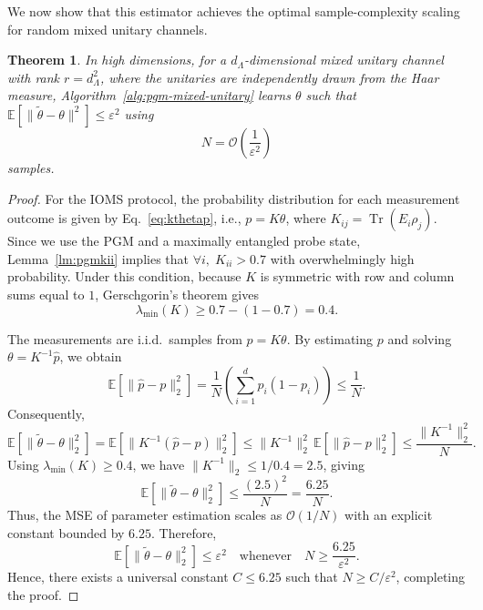 \documentclass[12pt]{article}
\newtheorem{theorem}{Theorem}
\begin{document}
We now show that this estimator achieves the optimal sample-complexity scaling for random mixed unitary channels.

\begin{theorem}
In high dimensions, for a $d_{\Lambda}$-dimensional mixed unitary channel with rank $r = d_{\Lambda}^2$, where the unitaries are independently drawn from the Haar measure, Algorithm~\ref{alg:pgm-mixed-unitary} learns $\theta$ such that $\mathbb{E}[\|\tilde{\theta} -\theta \|^2] \le \varepsilon^2$ using
\begin{equation}
    N = \mathcal{O}\!\left(\frac{1}{\varepsilon^2}\right)
\end{equation}
samples.
\end{theorem}


\begin{proof}
For the IOMS protocol, the probability distribution for each measurement outcome is given by Eq.~\ref{eq:kthetap}, i.e., $p = K\theta$, where $K_{ij} = \operatorname{Tr}(E_i \rho_j)$. 
Since we use the PGM and a maximally entangled probe state, Lemma~\ref{lm:pgmkii} implies that $\forall i,\; K_{ii} > 0.7$ with overwhelmingly high probability. 
Under this condition, because $K$ is symmetric with row and column sums equal to $1$, Gerschgorin’s theorem gives
\begin{equation}
    \lambda_{\min}(K) \ge 0.7 - (1 - 0.7) = 0.4.
\end{equation}

The measurements are i.i.d.\ samples from $p = K\theta$. 
By estimating $p$ and solving $\theta = K^{-1}\hat{p}$, we obtain
\begin{equation}
    \mathbb{E}\!\left[\|\hat{p} - p\|_2^2\right] 
    = \frac{1}{N}\!\left(\sum_{i=1}^d p_i(1 - p_i)\right)
    \le \frac{1}{N}.
\end{equation}
Consequently,
\begin{equation}
    \mathbb{E}\!\left[\|\tilde{\theta} - \theta\|_2^2\right]
    = \mathbb{E}\!\left[\|K^{-1}(\hat{p} - p)\|_2^2\right]
    \le \|K^{-1}\|_2^2 \, \mathbb{E}\!\left[\|\hat{p} - p\|_2^2\right]
    \le \frac{\|K^{-1}\|_2^2}{N}.
\end{equation}
Using $\lambda_{\min}(K)\ge 0.4$, we have $\|K^{-1}\|_2 \le 1/0.4 = 2.5$, giving
\begin{equation}
    \mathbb{E}\!\left[\|\tilde{\theta} - \theta\|_2^2\right]
    \le \frac{(2.5)^2}{N}
    = \frac{6.25}{N}.
\end{equation}
Thus, the MSE of parameter estimation scales as $\mathcal{O}(1/N)$ with an explicit constant bounded by $6.25$. Therefore,
\begin{equation}
    \mathbb{E}\!\left[\|\tilde{\theta} - \theta\|_2^2\right] \le \varepsilon^2
    \quad \text{whenever} \quad
    N \ge \frac{6.25}{\varepsilon^2}.
\end{equation}
Hence, there exists a universal constant $C \le 6.25$ such that $N \ge C/\varepsilon^2$, completing the proof.
\end{proof}
\end{document}
